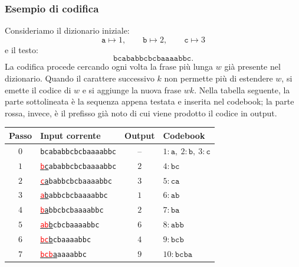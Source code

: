 \documentclass{article}
\theoremstyle{definition}
\numberwithin{equation}{section}
\begin{document}
\subsubsection{Esempio di codifica}
Consideriamo il dizionario iniziale:
\[
    \texttt{a}\mapsto 1,\qquad
    \texttt{b}\mapsto 2,\qquad
    \texttt{c}\mapsto 3
\]
e il testo:
\[
    \texttt{bcababbcbcbaaaabbc}.
\]
La codifica procede cercando ogni volta la frase più lunga $w$ già presente nel dizionario. Quando il carattere successivo $k$ non permette più di estendere $w$, si emette il codice di $w$ e si aggiunge la nuova frase $wk$. Nella tabella seguente, la parte sottolineata è la sequenza appena testata e inserita nel codebook; la parte rossa, invece, è il prefisso già noto di cui viene prodotto il codice in output.
\begin{table}[H]
    \centering
    \small
    \begin{tabular}{c|l|c|l}
        \textbf{Passo} & \textbf{Input corrente}                                                & \textbf{Output} & \textbf{Codebook}                            \\ \hline
        $0$            & \texttt{bcababbcbcbaaaabbc}                                            & --              & $1:\texttt{a},\ 2:\texttt{b},\ 3:\texttt{c}$ \\
        $1$            & \uline{\textcolor{red}{\texttt{b}}\texttt{c}}\texttt{ababbcbcbaaaabbc} & $2$             & $4:\texttt{bc}$                              \\
        $2$            & \uline{\textcolor{red}{\texttt{c}}\texttt{a}}\texttt{babbcbcbaaaabbc}  & $3$             & $5:\texttt{ca}$                              \\
        $3$            & \uline{\textcolor{red}{\texttt{a}}\texttt{b}}\texttt{abbcbcbaaaabbc}   & $1$             & $6:\texttt{ab}$                              \\
        $4$            & \uline{\textcolor{red}{\texttt{b}}\texttt{a}}\texttt{bbcbcbaaaabbc}    & $2$             & $7:\texttt{ba}$                              \\
        $5$            & \uline{\textcolor{red}{\texttt{ab}}\texttt{b}}\texttt{cbcbaaaabbc}     & $6$             & $8:\texttt{abb}$                             \\
        $6$            & \uline{\textcolor{red}{\texttt{bc}}\texttt{b}}\texttt{cbaaaabbc}       & $4$             & $9:\texttt{bcb}$                             \\
        $7$            & \uline{\textcolor{red}{\texttt{bcb}}\texttt{a}}\texttt{aaaabbc}        & $9$             & $10:\texttt{bcba}$                           \\

\end{tabular}
\end{table}
\end{document}
